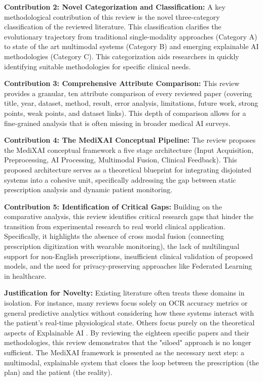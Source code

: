 \documentclass[conference]{IEEEtran}
\begin{document}
\textbf{Contribution 2: Novel Categorization and Classification:}
A key methodological contribution of this review is the novel three-category classification of the reviewed literature. This classification clarifies the evolutionary trajectory from traditional single-modality approaches (Category A) to state of the art multimodal systems (Category B) and emerging explainable AI methodologies (Category C). This categorization aids researchers in quickly identifying suitable methodologies for specific clinical needs.

\textbf{Contribution 3: Comprehensive Attribute Comparison:}
This review provides a granular, ten attribute comparison of every reviewed paper (covering title, year, dataset, method, result, error analysis, limitations, future work, strong points, weak points, and dataset links). This depth of comparison allows for a fine-grained analysis that is often missing in broader medical AI surveys.

\textbf{Contribution 4: The MediXAI Conceptual Pipeline:}
The review proposes the MediXAI conceptual framework a five stage architecture (Input Acquisition, Preprocessing, AI Processing, Multimodal Fusion, Clinical Feedback). This proposed architecture serves as a theoretical blueprint for integrating disjointed systems into a cohesive unit, specifically addressing the gap between static prescription analysis and dynamic patient monitoring.

\textbf{Contribution 5: Identification of Critical Gaps:}
Building on the comparative analysis, this review identifies critical research gaps that hinder the transition from experimental research to real world clinical application. Specifically, it highlights the absence of cross modal fusion (connecting prescription digitization with wearable monitoring), the lack of multilingual support for non-English prescriptions, insufficient clinical validation of proposed models, and the need for privacy-preserving approaches like Federated Learning in healthcare.

\textbf{Justification for Novelty:}
Existing literature often treats these domains in isolation. For instance, many reviews focus solely on OCR accuracy metrics \cite{mankash2024mirage,kumar2025doctors} or general predictive analytics \cite{intuitionlabs2026pharma,talekar2025interpreting} without considering how these systems interact with the patient's real-time physiological state. Others focus purely on the theoretical aspects of Explainable AI \cite{berha2018evaluation}. By reviewing the eighteen specific papers and their methodologies, this review demonstrates that the "siloed" approach is no longer sufficient. The MediXAI framework is presented as the necessary next step: a multimodal, explainable system that closes the loop between the prescription (the plan) and the patient (the reality).
\end{document}
